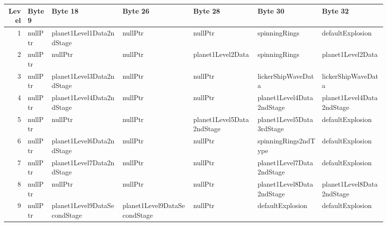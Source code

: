 \begin{figure}[H]
  {
    \setlength{\tabcolsep}{3.0pt}
    \setlength\cmidrulewidth{\heavyrulewidth} %
    \begin{adjustbox}{width=\textwidth}

      \begin{tabular}{rllllll}
        \toprule
        Level & Byte 9            & Byte 18                      & Byte 26                      & Byte 28                   & Byte 30                    & Byte 32                    \\
        \midrule
        1 & nullPtr           & planet1Level1Data2ndStage    & nullPtr                      & nullPtr                   & spinningRings              & defaultExplosion           \\
        2 & nullPtr           & nullPtr                      & nullPtr                      & planet1Level2Data         & spinningRings              & planet1Level2Data          \\
        3 & nullPtr           & planet1Level3Data2ndStage    & nullPtr                      & nullPtr                   & lickerShipWaveData         & lickerShipWaveData         \\
        4 & nullPtr           & planet1Level4Data2ndStage    & nullPtr                      & nullPtr                   & planet1Level4Data2ndStage  & planet1Level4Data2ndStage  \\
        5 & nullPtr           & nullPtr                      & nullPtr                      & planet1Level5Data2ndStage & planet1Level5Data3rdStage  & defaultExplosion           \\
        6 & nullPtr           & planet1Level6Data2ndStage    & nullPtr                      & nullPtr                   & spinningRings2ndType       & defaultExplosion           \\
        7 & nullPtr           & planet1Level7Data2ndStage    & nullPtr                      & nullPtr                   & planet1Level7Data2ndStage  & defaultExplosion           \\
        8 & nullPtr           & nullPtr                      & nullPtr                      & nullPtr                   & planet1Level8Data2ndStage  & planet1Level8Data2ndStage  \\
        9 & nullPtr           & planet1Level9DataSecondStage & planet1Level9DataSecondStage & nullPtr                   & defaultExplosion           & defaultExplosion           \\

\end{tabular}
\end{adjustbox}}
\end{figure}
